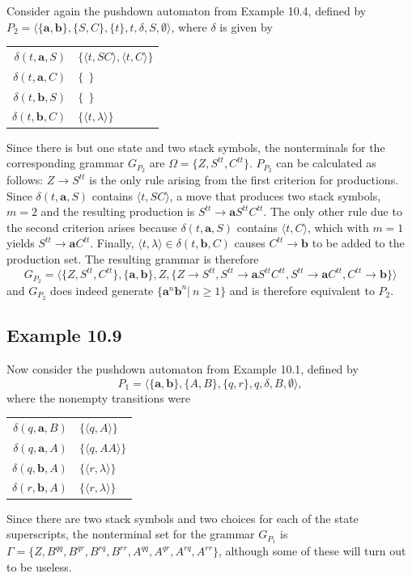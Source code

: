 Consider again the pushdown automaton from Example 10.4, defined by $P_2=\langle
\{\pmb{a},\pmb{b}\},\{S,C\},\{t\},t,\delta,S,\emptyset\rangle$, where $\delta$
is given by
\begin{center}\begin{tabular}{r@{ = }l}
$\delta(t,\pmb{a},S)$ & $\{\langle t,SC\rangle,\langle t,C\rangle\}$ \\
$\delta(t,\pmb{a},C)$ & $\{\ \ \}$ \\
$\delta(t,\pmb{b},S)$ & $\{\ \ \}$ \\
$\delta(t,\pmb{b},C)$ & $\{\langle t,\lambda\rangle\}$
\end{tabular}\end{center}
Since there is but one state and two stack symbols, the nonterminals for the
corresponding grammar $G_{P_2}$ are $\Omega=\{Z,S^{tt},C^{tt}\}$. $P_{P_2}$ can
be calculated as follows: $Z\rightarrow S^{tt}$ is the only rule arising from
the first criterion for productions. Since $\delta(t,\pmb{a},S)$ contains
$\langle t,SC\rangle$, a move that produces two stack symbols, $m=2$ and the
resulting production is $S^{tt}\rightarrow\pmb{a}S^{tt}C^{tt}$. The only other
rule due to the second criterion arises because $\delta(t,\pmb{a},S)$ contains
$\langle t,C\rangle$, which with $m=1$ yields $S^{tt}\rightarrow\pmb{a}C^{tt}$.
Finally, $\langle t,\lambda\rangle\in\delta(t,\pmb{b},C)$ causes $C^{tt}
\rightarrow\pmb{b}$ to be added to the production set. The resulting grammar is
therefore
\[ G_{P_2}=\langle\{Z,S^{tt},C^{tt}\},\{\pmb{a},\pmb{b}\},Z,\{Z\rightarrow
	S^{tt},S^{tt}\rightarrow\pmb{a}S^{tt}C^{tt},S^{tt}\rightarrow\pmb{a}
	C^{tt},C^{tt}\rightarrow\pmb{b}\}\rangle \]
and $G_{P_2}$ does indeed generate $\{\pmb{a}^n\pmb{b}^n|\ n \geq 1\}$ and is
therefore equivalent to $P_2$.

\subsection*{Example 10.9}

Now consider the pushdown automaton from Example 10.1, defined by
\[ P_1 = \langle\{\pmb{a},\pmb{b}\},\{A,B\},\{q,r\},q,\delta,B,\emptyset\rangle, \]
where the nonempty transitions were
\begin{center}\begin{tabular}{r@{ = }l}
$\delta(q,\pmb{a},B)$ & $\{\langle q,A\rangle\}$ \\
$\delta(q,\pmb{a},A)$ & $\{\langle q,AA\rangle\}$ \\
$\delta(q,\pmb{b},A)$ & $\{\langle r,\lambda\rangle\}$ \\
$\delta(r,\pmb{b},A)$ & $\{\langle r,\lambda\rangle\}$
\end{tabular}\end{center}
Since there are two stack symbols and two choices for each of the state
superscripts, the nonterminal set for the grammar $G_{P_1}$ is $\Gamma=\{Z,B^{qq},
B^{qr},B^{rq},B^{rr},A^{qq},A^{qr},A^{rq},A^{rr}\}$, although some of these will
turn out to be useless.

